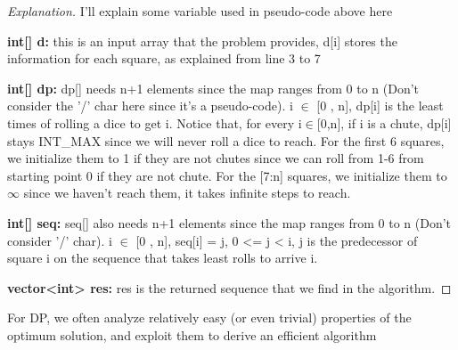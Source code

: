 \documentclass[openany]{article}
\begin{document}
\begin{proof}[Explanation]{}
		\renewcommand{\qedsymbol}{} %
        I'll explain some variable used in pseudo-code above here

        \textbf{int[] d:} this is an input array that the problem provides, d[i] stores the information for each square, as explained from line 3 to 7

        \textbf{int[] dp:} dp[] needs n+1 elements since the map ranges from 0 to n (Don't consider the '/' char here since it's a pseudo-code). i $\in$ [0 , n], dp[i] is the least times of rolling a dice to get i. Notice that, for every i$\in$[0,n], if i is a chute, dp[i] stays INT\_MAX since we will never roll a dice to reach. For the first 6 squares, we initialize them to 1 if they are not chutes since we can roll from 1-6 from starting point 0 if they are not chute. For the [7:n] squares, we initialize them to $\infty$ since we haven't reach them, it takes infinite steps to reach.

        \textbf{int[] seq:} seq[] also needs n+1 elements since the map ranges from 0 to n (Don't consider '/' char). i $\in$ [0 , n], seq[i] = j, 0 <= j < i, j is the predecessor of square i on the sequence that takes least rolls to arrive i.

        \textbf{vector<int> res:} res is the returned sequence that we find in the algorithm.
\end{proof}

\begin{theorem*}{}
    For DP, we often analyze relatively easy (or even trivial) properties of the optimum solution, and exploit them to derive an efficient algorithm
\end{theorem*}
\end{document}
